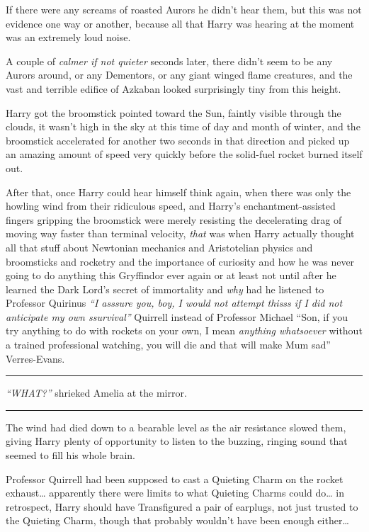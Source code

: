If there were any screams of roasted Aurors he didn't hear them, but
this was not evidence one way or another, because all that Harry was
hearing at the moment was an extremely loud noise.

A couple of \emph{calmer if not quieter} seconds later, there didn't
seem to be any Aurors around, or any Dementors, or any giant winged
flame creatures, and the vast and terrible edifice of Azkaban looked
surprisingly tiny from this height.

Harry got the broomstick pointed toward the Sun, faintly visible through
the clouds, it wasn't high in the sky at this time of day and month of
winter, and the broomstick accelerated for another two seconds in that
direction and picked up an amazing amount of speed very quickly before
the solid-fuel rocket burned itself out.

After that, once Harry could hear himself think again, when there was
only the howling wind from their ridiculous speed, and Harry's
enchantment-assisted fingers gripping the broomstick were merely
resisting the decelerating drag of moving way faster than terminal
velocity, \emph{that} was when Harry actually thought all that stuff
about Newtonian mechanics and Aristotelian physics and broomsticks and
rocketry and the importance of curiosity and how he was never going to
do anything this Gryffindor ever again or at least not until after he
learned the Dark Lord's secret of immortality and \emph{why} had he
listened to Professor Quirinus \emph{``I asssure you, boy, I would not
attempt thisss if I did not anticipate my own ssurvival''} Quirrell
instead of Professor Michael ``Son, if you try anything to do with
rockets on your own, I mean \emph{anything whatsoever} without a trained
professional watching, you will die and that will make Mum sad''
Verres-Evans.

\begin{center}\rule{3in}{0.4pt}\end{center}

\emph{``WHAT?''} shrieked Amelia at the mirror.

\begin{center}\rule{3in}{0.4pt}\end{center}

The wind had died down to a bearable level as the air resistance slowed
them, giving Harry plenty of opportunity to listen to the buzzing,
ringing sound that seemed to fill his whole brain.

Professor Quirrell had been supposed to cast a Quieting Charm on the
rocket exhaust\ldots{} apparently there were limits to what Quieting
Charms could do\ldots{} in retrospect, Harry should have Transfigured a
pair of earplugs, not just trusted to the Quieting Charm, though that
probably wouldn't have been enough either\ldots{}


